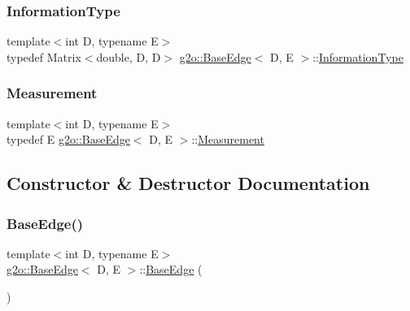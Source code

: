 \mbox{\label{classg2o_1_1_base_edge_a2e5a33343ac3f189d8a7d5ee4d8b73fc}} 
\subsubsection{\texorpdfstring{Information\+Type}{InformationType}}
{\footnotesize\ttfamily template$<$int D, typename E$>$ \\
typedef Matrix$<$double, D, D$>$ \mbox{\hyperlink{classg2o_1_1_base_edge}{g2o\+::\+Base\+Edge}}$<$ D, E $>$\+::\mbox{\hyperlink{classg2o_1_1_base_edge_a2e5a33343ac3f189d8a7d5ee4d8b73fc}{Information\+Type}}}

\mbox{\label{classg2o_1_1_base_edge_a2c148abba650a20b8c7eed75d3e2211e}} 
\subsubsection{\texorpdfstring{Measurement}{Measurement}}
{\footnotesize\ttfamily template$<$int D, typename E$>$ \\
typedef E \mbox{\hyperlink{classg2o_1_1_base_edge}{g2o\+::\+Base\+Edge}}$<$ D, E $>$\+::\mbox{\hyperlink{classg2o_1_1_base_edge_a2c148abba650a20b8c7eed75d3e2211e}{Measurement}}}



\subsection{Constructor \& Destructor Documentation}
\mbox{\label{classg2o_1_1_base_edge_a5efd0eb7e76a7f1ad723e7a5896a54d5}} 
\subsubsection{\texorpdfstring{Base\+Edge()}{BaseEdge()}}
{\footnotesize\ttfamily template$<$int D, typename E$>$ \\
\mbox{\hyperlink{classg2o_1_1_base_edge}{g2o\+::\+Base\+Edge}}$<$ D, E $>$\+::\mbox{\hyperlink{classg2o_1_1_base_edge}{Base\+Edge}} (\begin{DoxyParamCaption}{ }\end{DoxyParamCaption})\hspace{0.3cm}{\ttfamily [inline]}}

